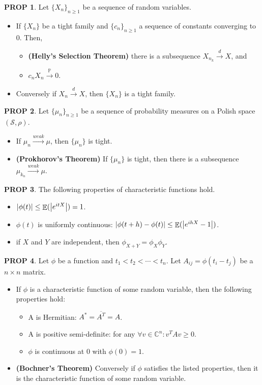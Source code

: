 \documentclass[hidelinks,11pt]{article}
\theoremstyle{definition}
\theoremstyle{dotless}
\newtheorem{prop}{PROP}[section]
\theoremstyle{remark}
\DeclareMathOperator{\E}{\mathbb{E}}
\DeclareMathOperator{\1}{\mathbf{1}}
\begin{document}
\begin{prop}
Let $\{X_n\}_{n\geq1}$ be a sequence of random variables.
\begin{itemize}
\item If $\{X_n\}$ be a tight family and $\{c_n\}_{n\geq1}$ a sequence of constants converging to 0. Then,\begin{itemize}
    \item \textup{\textbf{(Helly's Selection Theorem)}} there is a subsequence $X_{n_k}\xrightarrow{d}X$, and
    \item $c_nX_n\xrightarrow{\mathbb{P}}0$.
\end{itemize}
\item Conversely if $X_n\xrightarrow{d}X$, then $\{X_n\}$ is a tight family.
\end{itemize}
\end{prop}

\begin{prop}
Let $\{\mu_n\}_{n\geq1}$ be a sequence of probability measures on a Polish space $(\mathcal{S},\rho)$.\begin{itemize}
    \item If $\mu_n\xrightarrow{weak}\mu$, then $\{\mu_n\}$ is tight.
    \item \textup{\textbf{(Prokhorov's Theorem)}} If $\{\mu_n\}$ is tight, then there is a subsequence $\mu_{k_n}\xrightarrow{weak}\mu$.
\end{itemize}
\end{prop}

\begin{prop}
The following properties of characteristic functions hold.
\begin{itemize}
    \item $\abs{\phi(t)}\leq\E(\abs{e^{itX}})=1$.
    \item $\phi(t)$ is uniformly continuous: $\abs{\phi(t+h)-\phi(t)}\leq\E(\abs{e^{ihX}-1})$.
    \item if $X$ and $Y$ are independent, then $\phi_{X+Y}=\phi_X\phi_Y$.
\end{itemize}
\end{prop}

\begin{prop}
Let $\phi$ be a function and $t_1<t_2<\cdots<t_n$. Let $A_{ij}=\phi(t_i-t_j)$ be a $n\times n$ matrix.\begin{itemize}
    \item If $\phi$ is a characteristic function of some random variable, then the following properties hold:\begin{itemize}
        \item A is Hermitian: $A^*=\overline{A^T}=A$.
        \item A is positive semi-definite: for any $\forall v\in\mathbb{C}^n:v^TAv\geq0$.
        \item $\phi$ is continuous at 0 with $\phi(0)=1$.
    \end{itemize}
    \item \textup{\textbf{(Bochner's Theorem)}} Conversely if $\phi$ satisfies the listed properties, then it is the characteristic function of some random variable.
\end{itemize}
\end{prop}
\end{document}
